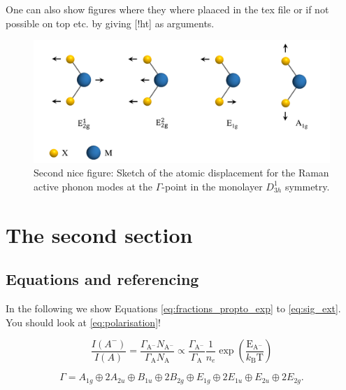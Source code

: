 One can also show figures where they where plaaced in the tex file or if not possible on top etc. by giving [!ht] as arguments.

\begin{figure}[!htb]
	\includegraphics[width=1\textwidth,keepaspectratio=true]{Images/Ramanmoden.pdf}
	\caption[]{Second nice figure: Sketch of the atomic displacement for the Raman active phonon modes at the $\Gamma$-point in the monolayer $D_{3h}^1$ symmetry.}
	\label{fig:ramanmodes}
\end{figure}

\unpacklipsum[2-3]{}\lipsumexp

\newpage

\section{The second section}\label{sec:the_sec_sec}

\unpacklipsum[3]{}\lipsumexp

\subsection{Equations and referencing}\label{subsec:formulas}

In the following we show Equations \ref{eq:fractions_propto_exp} to \ref{eq:sig_ext}. You should look at \autoref{eq:polarisation}!

\begin{equation}\label{eq:fractions_propto_exp}
	\frac{I\left(A^-\right)}{I\left( A\right)}
	=\frac{\Gamma_{\text{A}^-}N_{\text{A}^-}}{\Gamma_\text{A}N_{\text{A}}}\propto\frac{\Gamma_{\text{A}^-}}{\Gamma_{\text{A}}}\frac{1}{n_e}\exp{\left(\frac{\text{E}_{\text{A}^-}}{k_{\text{B}}\text{T}}\right)}
\end{equation}

\begin{equation}\label{eq:oplus}
	\Gamma=A_{1g}\oplus 2A_{2u}\oplus B_{1u}\oplus 2B_{2g}\oplus E_{1g}\oplus 2E_{1u}\oplus E_{2u}\oplus 2E_{2g}.
\end{equation}

